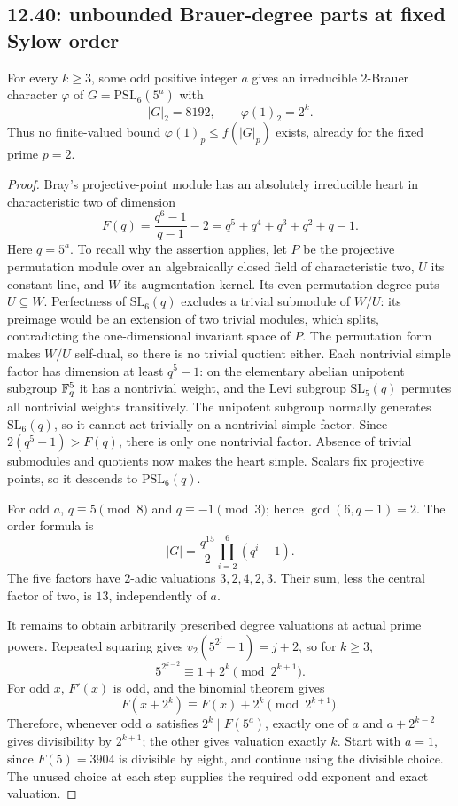 \subsection{12.40: unbounded Brauer-degree parts at fixed Sylow order}
\label{cand:12.40}
\begin{proposition}
For every \(k\ge3\), some odd positive integer \(a\) gives an
irreducible \(2\)-Brauer character \(\varphi\) of
\(G=\mathrm{PSL}_6(5^a)\) with
\[
 |G|_2=8192,\qquad \varphi(1)_2=2^k.
\]
Thus no finite-valued bound \(\varphi(1)_p\le f(|G|_p)\) exists,
already for the fixed prime \(p=2\).
\end{proposition}
\begin{proof}
Bray's projective-point module \cite[Main Theorem]{bray-cohomology}
has an absolutely irreducible heart in characteristic two of dimension
\[
 F(q)=\frac{q^6-1}{q-1}-2=q^5+q^4+q^3+q^2+q-1.
\]
Here \(q=5^a\). To recall why the assertion applies, let \(P\) be the
projective permutation module over an algebraically closed field of
characteristic two, \(U\) its constant line, and \(W\) its augmentation
kernel. Its even permutation degree puts \(U\subseteq W\).
Perfectness of \(\mathrm{SL}_6(q)\) excludes a trivial submodule of
\(W/U\): its preimage would be an extension of two trivial modules,
which splits, contradicting the one-dimensional invariant space of \(P\).
The permutation form makes \(W/U\) self-dual, so there is no trivial
quotient either. Each nontrivial simple factor has dimension at least
\(q^5-1\): on the elementary abelian unipotent subgroup \(\mathbb F_q^5\)
it has a nontrivial weight, and the Levi subgroup
\(\mathrm{SL}_5(q)\) permutes all nontrivial weights transitively.
The unipotent subgroup normally generates \(\mathrm{SL}_6(q)\), so
it cannot act trivially on a nontrivial simple factor.
Since \(2(q^5-1)>F(q)\), there is only one nontrivial factor.
Absence of trivial submodules and quotients now makes the heart simple.
Scalars fix projective points, so it descends to \(\mathrm{PSL}_6(q)\).

For odd \(a\), \(q\equiv5\pmod8\) and \(q\equiv-1\pmod3\);
hence \(\gcd(6,q-1)=2\). The order formula is
\[
 |G|=\frac{q^{15}}2\prod_{i=2}^{6}(q^i-1).
\]
The five factors have \(2\)-adic valuations \(3,2,4,2,3\).
Their sum, less the central factor of two, is \(13\), independently
of \(a\).

It remains to obtain arbitrarily prescribed degree valuations at
actual prime powers. Repeated squaring gives
\(v_2(5^{2^j}-1)=j+2\), so for \(k\ge3\),
\[
 5^{2^{k-2}}\equiv1+2^k\pmod{2^{k+1}}.
\]
For odd \(x\), \(F'(x)\) is odd, and the binomial theorem gives
\[
 F(x+2^k)\equiv F(x)+2^k\pmod{2^{k+1}}.
\]
Therefore, whenever odd \(a\) satisfies \(2^k\mid F(5^a)\),
exactly one of \(a\) and \(a+2^{k-2}\) gives divisibility by
\(2^{k+1}\); the other gives valuation exactly \(k\).
Start with \(a=1\), since \(F(5)=3904\) is divisible by eight,
and continue using the divisible choice. The unused choice at each
step supplies the required odd exponent and exact valuation.
\end{proof}

